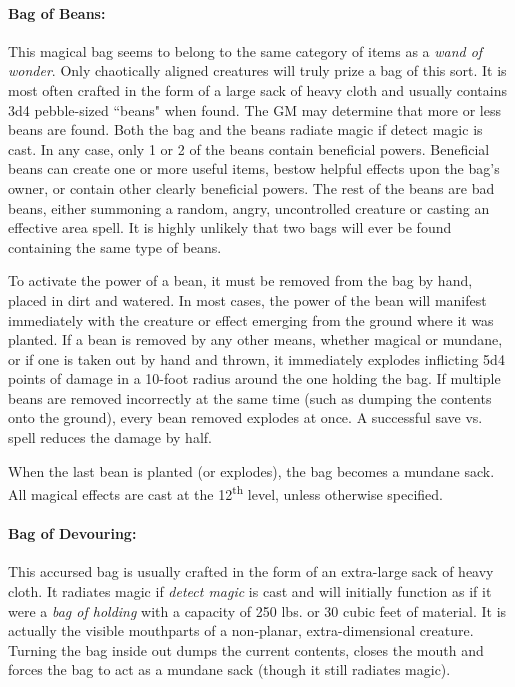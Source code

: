 \begin{multicols}{2}

\paragraph{Bag of Beans:} This magical bag seems to belong to the same category of items as a \textit{wand of wonder}.  Only chaotically aligned creatures will truly prize a bag of this sort.  It is most often crafted in the form of a large sack of heavy cloth and usually contains 3d4 pebble-sized ``beans" when found.  The GM may determine that more or less beans are found.  Both the bag and the beans radiate magic if detect magic is cast.  In any case, only 1 or 2 of the beans contain beneficial powers.  Beneficial beans can create one or more useful items, bestow helpful effects upon the bag's owner, or contain other clearly beneficial powers.  The rest of the beans are bad beans, either summoning a random, angry, uncontrolled creature or casting an effective area spell.  It is highly unlikely that two bags will ever be found containing the same type of beans. 

To activate the power of a bean, it must be removed from the bag by hand, placed in dirt and watered.  In most cases, the power of the bean will manifest immediately with the creature or effect emerging from the ground where it was planted.  If a bean is removed by any other means, whether magical or mundane, or if one is taken out by hand and thrown, it immediately explodes inflicting 5d4 points of damage in a 10-foot radius around the one holding the bag.  If multiple beans are removed incorrectly at the same time (such as dumping the contents onto the ground), every bean removed explodes at once.  A successful save vs. spell reduces the damage by half.

When the last bean is planted (or explodes), the bag becomes a mundane sack.  All magical effects are cast at the 12\textsuperscript{th} level, unless otherwise specified.



\paragraph{Bag of Devouring:} This accursed bag is usually crafted in the form of an extra-large sack of heavy cloth.  It radiates magic if \textit{detect magic} is cast and will initially function as if it were a \textit{bag of holding} with a capacity of 250 lbs. or 30 cubic feet of material.  It is actually the visible mouthparts of a non-planar, extra-dimensional creature.  Turning the bag inside out dumps the current contents, closes the mouth and forces the bag to act as a mundane sack (though it still radiates magic). 


\end{multicols}
